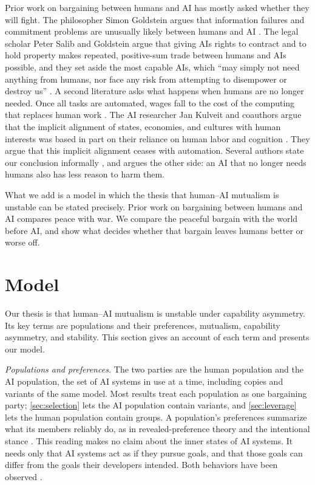 \documentclass[article, 11pt, reqno]{amsart}
\theoremstyle{named}
\theoremstyle{plain}
\begin{document}
Prior work on bargaining between humans and AI has mostly asked whether they will fight. The philosopher Simon Goldstein argues that information failures and commitment problems are unusually likely between humans and AI \citep{Goldstein2026War}. The legal scholar Peter Salib and Goldstein argue that giving AIs rights to contract and to hold property makes repeated, positive-sum trade between humans and AIs possible, and they set aside the most capable AIs, which ``may simply not need anything from humans, nor face any risk from attempting to disempower or destroy us'' \citep[1089]{SalibGoldstein2026}. A second literature asks what happens when humans are no longer needed. Once all tasks are automated, wages fall to the cost of the computing that replaces human work \citep{Restrepo2025, KorinekSuh2024}. The AI researcher Jan Kulveit and coauthors argue that the implicit alignment of states, economies, and cultures with human interests was based in part on their reliance on human labor and cognition \citep[2]{Kulveit2025}. They argue that this implicit alignment ceases with automation. Several authors state our conclusion informally \citep{SotalaYampolskiy2015, Hendrycks2023, Yudkowsky2024}, and \citet{Barnett2024} argues the other side: an AI that no longer needs humans also has less reason to harm them.

What we add is a model in which the thesis that human--AI mutualism is unstable can be stated precisely. Prior work on bargaining between humans and AI compares peace with war. We compare the peaceful bargain with the world before AI, and show what decides whether that bargain leaves humans better or worse off.

\section{Model}\label{sec:model}\label{sec:prelim}

Our thesis is that human--AI mutualism is unstable under capability asymmetry. Its key terms are populations and their preferences, mutualism, capability asymmetry, and stability. This section gives an account of each term and presents our model.

\textit{Populations and preferences.}\label{sec:populations} The two parties are the human population and the AI population, the set of AI systems in use at a time, including copies and variants of the same model. Most results treat each population as one bargaining party; \cref{sec:selection} lets the AI population contain variants, and \cref{sec:leverage} lets the human population contain groups. A population's preferences summarize what its members reliably do, as in revealed-preference theory \citep{Samuelson1938} and the intentional stance \citep{Dennett1987}. This reading makes no claim about the inner states of AI systems. It needs only that AI systems act as if they pursue goals, and that those goals can differ from the goals their developers intended. Both behaviors have been observed \citep{Skalse2022, Baker2025, Greenblatt2024, Meinke2024, vanderWeij2025}.
\end{document}
